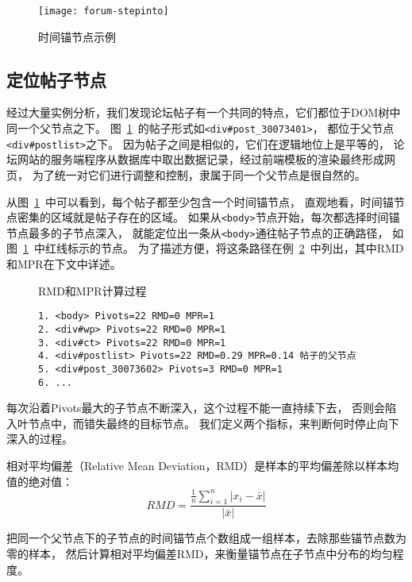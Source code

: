 \begin{figure}[htbp]
\centering
\texttt{[image: forum-stepinto]}
\caption{时间锚节点示例}
\label{fig:forum-stepinto}
\end{figure}

\subsection{定位帖子节点}
经过大量实例分析，我们发现论坛帖子有一个共同的特点，它们都位于DOM树中同一个父节点之下。
图~\ref{fig:forum-stepinto}~的帖子形式如\texttt{<div\#post\_30073401>}，
都位于父节点\texttt{<div\#postlist>}之下。
因为帖子之间是相似的，它们在逻辑地位上是平等的，
论坛网站的服务端程序从数据库中取出数据记录，经过前端模板的渲染最终形成网页，
为了统一对它们进行调整和控制，隶属于同一个父节点是很自然的。

从图~\ref{fig:forum-stepinto}~中可以看到，每个帖子都至少包含一个时间锚节点，
直观地看，时间锚节点密集的区域就是帖子存在的区域。
如果从\texttt{<body>}节点开始，每次都选择时间锚节点最多的子节点深入，
就能定位出一条从\texttt{<body>}通往帖子节点的正确路径，
如图~\ref{fig:forum-stepinto}~中红线标示的节点。
为了描述方便，将这条路径在例~\ref{ex:rmd-mpr}~中列出，其中RMD和MPR在下文中详述。

\begin{figure}[htbp]
\begin{example}
\label{ex:rmd-mpr}
RMD和MPR计算过程
\end{example}
\begin{verbatim}
1. <body> Pivots=22 RMD=0 MPR=1
2. <div#wp> Pivots=22 RMD=0 MPR=1
3. <div#ct> Pivots=22 RMD=0 MPR=1
4. <div#postlist> Pivots=22 RMD=0.29 MPR=0.14 帖子的父节点
5. <div#post_30073602> Pivots=3 RMD=0 MPR=1
6. ...
\end{verbatim}
\end{figure}

每次沿着Pivots最大的子节点不断深入，这个过程不能一直持续下去，
否则会陷入叶节点中，而错失最终的目标节点。
我们定义两个指标，来判断何时停止向下深入的过程。

\begin{definition}
\label{def:rmd}
相对平均偏差（Relative Mean Deviation，RMD）是样本的平均偏差除以样本均值的绝对值：
\begin{equation}
RMD = \frac{\frac{1}{n} \sum_{i=1}^{n} \vert x_i - \bar x \vert}
{\vert \bar x \vert}
\end{equation}
\end{definition}

把同一个父节点下的子节点的时间锚节点个数组成一组样本，去除那些锚节点数为零的样本，
然后计算相对平均偏差RMD，来衡量锚节点在子节点中分布的均匀程度。

